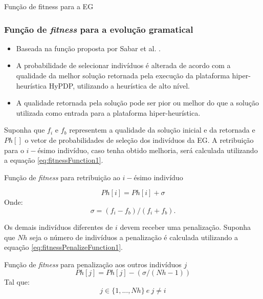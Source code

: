 \begin{frame}[allowframebreaks]{Função de fitness para a EG}
	\frametitle{Função de \textit{fitness} para a evolução gramatical}
	
			\begin{itemize}
			\item Baseada na função proposta por Sabar et al. \cite{sabar2015automatic}.
			
			\item A probabilidade de selecionar indivíduos é alterada de acordo com a qualidade
			da melhor solução retornada pela execução da plataforma  hiper-heurística HyPDP, utilizando a heurística de alto nível.
			
			\item A
			qualidade retornada pela solução pode ser pior ou melhor do que a solução utilizada como
			entrada para a plataforma hiper-heurística.
		
			\end{itemize}
		

Suponha que $f_i$ e $f_b$ representem a qualidade da solução inicial e da retornada e $Ph[]$ o vetor de probabilidades de seleção dos indivíduos da EG. A retribuição para o $i-$ésimo indivíduo, caso tenha obtido melhoria, será calculada utilizando a equação \ref{eq:fitnessFunction1}.

	\begin{block}{Função de \textit{fitness} para retribuição ao $i-$ésimo indivíduo}
		
		 \begin{equation} {}
		 \label{eq:fitnessFunction1}
		 Ph[i] = Ph[i] + \sigma 
		 \end{equation}
		  Onde:
		 \begin{equation}
					 \sigma = (f_i - f_b)/(f_i + f_b). 
		 \end{equation}		
	\end{block}
	\framebreak
	
	Os demais indivíduos diferentes de $i$ devem receber uma penalização. Suponha que $Nh$ seja o número de indivíduos a penalização é calculada utilizando a equação \ref{eq:fitnessPenalizeFunction1}.
	\begin{block}{Função de \textit{fitness} para penalização aos outros indivíduos $j$}
		\begin{equation} {}
		\label{eq:fitnessPenalizeFunction1}
		Ph[j] = Ph[j] - (\sigma / (Nh - 1))
		\end{equation}
		Tal que:	
		\begin{equation} {}
		\label{eq:fitnessPenalizeFunction2}
		j \in \{1, ..., Nh\} ~e~ j \neq i
		\end{equation}
		

\end{block}
\end{frame}
